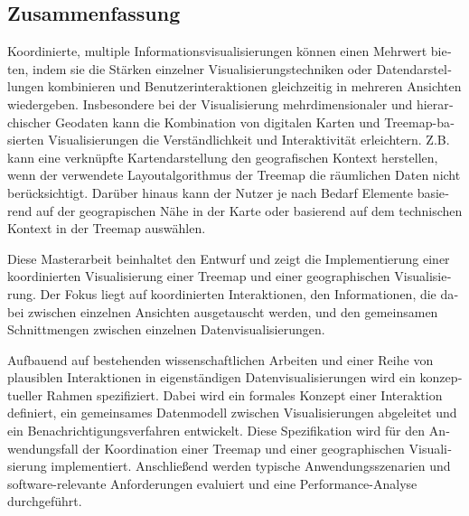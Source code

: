 \begin{otherlanguage}{german}
\chapter*{Zusammenfassung}

Koordinierte, multiple Informationsvisualisierungen können einen Mehrwert bieten, indem sie die Stärken einzelner Visualisierungstechniken oder Datendarstellungen kombinieren und Benutzerinteraktionen gleichzeitig in mehreren Ansichten wiedergeben.
Insbesondere bei der Visualisierung mehrdimensionaler und hierarchischer Geodaten kann die Kombination von digitalen Karten und Treemap-basierten Visualisierungen die Verständlichkeit und Interaktivität erleichtern.
Z.B. kann eine verknüpfte Kartendarstellung den geografischen Kontext herstellen, wenn der verwendete Layoutalgorithmus der Treemap die räumlichen Daten nicht berücksichtigt.
Darüber hinaus kann der Nutzer je nach Bedarf Elemente basierend auf der geograpischen Nähe in der Karte oder basierend auf dem technischen Kontext in der Treemap auswählen.

Diese Masterarbeit beinhaltet den Entwurf und zeigt die Implementierung einer koordinierten Visualisierung einer Treemap und einer geographischen Visualisierung.
Der Fokus liegt auf koordinierten Interaktionen, den Informationen, die dabei zwischen einzelnen Ansichten ausgetauscht werden, und den gemeinsamen Schnittmengen zwischen einzelnen Datenvisualisierungen.

Aufbauend auf bestehenden wissenschaftlichen Arbeiten und einer Reihe von plausiblen Interaktionen in eigenständigen Datenvisualisierungen wird ein konzeptueller Rahmen spezifiziert.
Dabei wird ein formales Konzept einer Interaktion definiert, ein gemeinsames Datenmodell zwischen Visualisierungen abgeleitet und ein Benachrichtigungsverfahren entwickelt.
Diese Spezifikation wird für den Anwendungsfall der Koordination einer Treemap und einer geographischen Visualisierung implementiert.
Anschließend werden typische Anwendungsszenarien und software-relevante Anforderungen evaluiert und eine Performance-Analyse durchgeführt.

\end{otherlanguage}

